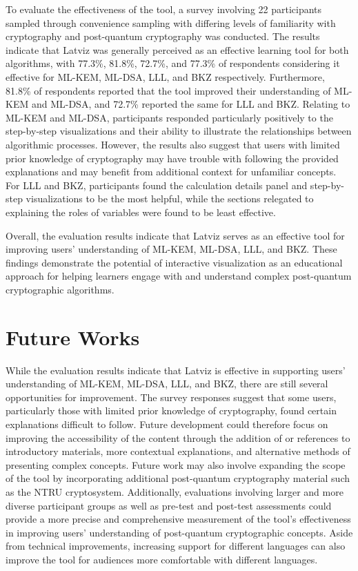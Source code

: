 To evaluate the effectiveness of the tool, a survey involving 22 participants sampled through convenience sampling with differing levels of familiarity with cryptography and post-quantum cryptography was conducted. The results indicate that Latviz was generally perceived as an effective learning tool for both algorithms, with 77.3\%, 81.8\%, 72.7\%, and 77.3\% of respondents considering it effective for ML-KEM, ML-DSA, LLL, and BKZ respectively. Furthermore, 81.8\% of respondents reported that the tool improved their understanding of ML-KEM and ML-DSA, and 72.7\% reported the same for LLL and BKZ. Relating to ML-KEM and ML-DSA, participants responded particularly positively to the step-by-step visualizations and their ability to illustrate the relationships between algorithmic processes. However, the results also suggest that users with limited prior knowledge of cryptography may have trouble with following the provided explanations and may benefit from additional context for unfamiliar concepts. For LLL and BKZ, participants found the calculation details panel and step-by-step visualizations to be the most helpful, while the sections relegated to explaining the roles of variables were found to be least effective. 

Overall, the evaluation results indicate that Latviz serves as an effective tool for improving users' understanding of ML-KEM, ML-DSA, LLL, and BKZ. These findings demonstrate the potential of interactive visualization as an educational approach for helping learners engage with and understand complex post-quantum cryptographic algorithms.
\section{Future Works}
\label{sec:saran}
While the evaluation results indicate that Latviz is effective in supporting users’ understanding of ML-KEM, ML-DSA, LLL, and BKZ, there are still several opportunities for improvement. The survey responses suggest that some users, particularly those with limited prior knowledge of cryptography, found certain explanations difficult to follow. Future development could therefore focus on improving the accessibility of the content through the addition of or references to introductory materials, more contextual explanations, and alternative methods of presenting complex concepts.
Future work may also involve expanding the scope of the tool by incorporating additional post-quantum cryptography material such as the NTRU cryptosystem. Additionally, evaluations involving larger and more diverse participant groups as well as pre-test and post-test assessments could provide a more precise and comprehensive measurement of the tool’s effectiveness in improving users’ understanding of post-quantum cryptographic concepts. Aside from technical improvements, increasing support for different languages can also improve the tool for audiences more comfortable with different languages.

